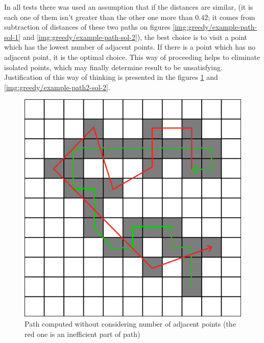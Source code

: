 \documentclass[titlepage]{article}
\newcommand{\multifigcaption}{\captionsetup{justification=justified}}
\begin{document}
 In all tests there was used an assumption that if the distances are similar, (it is each one of them isn't greater than the other one more than $0.42$; it comes from subtraction of distances of these two paths on figures \ref{img:greedy/example-path-sol-1} and \ref{img:greedy/example-path-sol-2}), the best choice is to visit a point which has the lowest number of adjacent points. If there is a point which has no adjacent point, it is the optimal choice. This way of proceeding helps to eliminate isolated points, which may finally determine result to be unsatisfying. Justification of this way of thinking is presented in the figures \ref{img:greedy/example-path2-sol-1} and \ref{img:greedy/example-path2-sol-2}.
 
 \begin{figure}[H]
 	\begin{center}
 		\begin{minipage}{.45\linewidth}
 			\includegraphics[width=\textwidth]{img/greedy/example-path2-sol-1.png}
			\multifigcaption
 			\caption{Path computed without considering number of adjacent points (the red one is an inefficient part of path)}
 			\label{img:greedy/example-path2-sol-1}
 		\end{minipage}
 		\hspace{.05\linewidth}
 		\begin{minipage}{.45\linewidth}

\end{minipage}
\end{center}
\end{figure}
\end{document}
